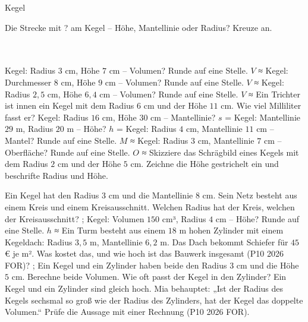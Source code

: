\begin{aufgabe}{Kegel}
\begin{teile}
\teil Die Strecke mit ? am Kegel – Höhe, Mantellinie oder Radius? Kreuze an.\\ \\ \\ 

\teil Kegel: Radius $3$ cm, Höhe $7$ cm – Volumen? Runde auf eine Stelle. $V$ ≈ \leerfeld[cm³]
\teil Kegel: Durchmesser $8$ cm, Höhe $9$ cm – Volumen? Runde auf eine Stelle. $V$ ≈ \leerfeld[cm³]
\teil Kegel: Radius $2{,}5$ cm, Höhe $6{,}4$ cm – Volumen? Runde auf eine Stelle. $V$ ≈ \leerfeld[cm³]
\teil Ein Trichter ist innen ein Kegel mit dem Radius $6$ cm und der Höhe $11$ cm. Wie viel Milliliter fasst er? \leerfeld[ml]
\teil Kegel: Radius $16$ cm, Höhe $30$ cm – Mantellinie? $s$ = \leerfeld[cm]
\teil Kegel: Mantellinie $29$ m, Radius $20$ m – Höhe? $h$ = \leerfeld[m]
\teil Kegel: Radius $4$ cm, Mantellinie $11$ cm – Mantel? Runde auf eine Stelle. $M$ ≈ \leerfeld[cm²]
\teil Kegel: Radius $3$ cm, Mantellinie $7$ cm – Oberfläche? Runde auf eine Stelle. $O$ ≈ \leerfeld[cm²]
\teil Skizziere das Schrägbild eines Kegels mit dem Radius $2$ cm und der Höhe $5$ cm. Zeichne die Höhe gestrichelt ein und beschrifte Radius und Höhe.

\teil Ein Kegel hat den Radius $3$ cm und die Mantellinie $8$ cm. Sein Netz besteht aus einem Kreis und einem Kreisausschnitt. Welchen Radius hat der Kreis, welchen der Kreisausschnitt? \leerfeld[cm] ; \leerfeld[cm]
\teil Kegel: Volumen $150$ cm³, Radius $4$ cm – Höhe? Runde auf eine Stelle. $h$ ≈ \leerfeld[cm]
\teil Ein Turm besteht aus einem $18$ m hohen Zylinder mit einem Kegeldach: Radius $3{,}5$ m, Mantellinie $6{,}2$ m. Das Dach bekommt Schiefer für $45$ € je m². Was kostet das, und wie hoch ist das Bauwerk insgesamt \hfill (P10 2026 FOR)? \leerfeld[€] ; \leerfeld[m]
\teil Ein Kegel und ein Zylinder haben beide den Radius $3$ cm und die Höhe $5$ cm. Berechne beide Volumen. Wie oft passt der Kegel in den Zylinder?
\teil Ein Kegel und ein Zylinder sind gleich hoch. Mia behauptet: „Ist der Radius des Kegels sechsmal so groß wie der Radius des Zylinders, hat der Kegel das doppelte Volumen.“ Prüfe die Aussage mit einer Rechnung \hfill (P10 2026 FOR).
\end{teile}
\end{aufgabe}

